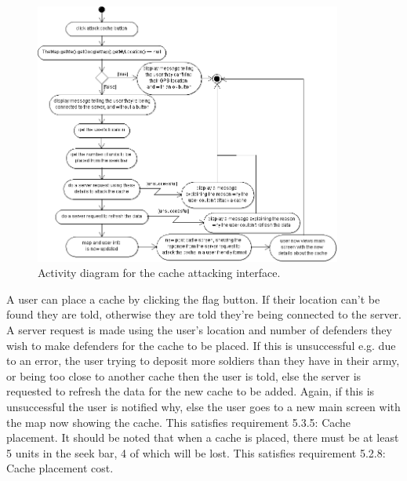\newpage
\begin{figure}
    \centering
    \includegraphics[width=0.9\textwidth]{images/activity/attackCache}
    \caption{Activity diagram for the cache attacking interface.}
\end{figure}

A user can place a cache by clicking the flag button. If their location can't be found they are told, otherwise they are told they're being connected to the server. A server request is made using the user's location and number of defenders they wish to make defenders for the cache to be placed. If this is unsuccessful e.g. due to an error, the user trying to deposit more soldiers than they have in their army, or being too close to another cache then the user is told, else the server is requested to refresh the data for the new cache to be added. Again, if this is unsuccessful the user is notified why, else the user goes to a new main screen with the map now showing the cache. This satisfies requirement 5.3.5: Cache placement. It should be noted that when a cache is placed, there must be at least 5 units in the seek bar, 4 of which will be lost. This satisfies requirement 5.2.8: Cache placement cost.

